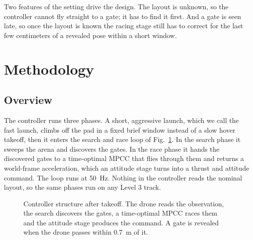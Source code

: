 \documentclass[conference]{IEEEtran}
\begin{document}
Two features of the setting drive the design. The layout is unknown, so the controller cannot fly straight to a gate; it has to find it first. And a gate is seen late, so once the layout is known the racing stage still has to correct for the last few centimeters of a revealed pose within a short window.

\section{Methodology}
\label{sec:method}

\subsection{Overview}
The controller runs three phases. A short, aggressive launch, which we call the fast launch, climbs off the pad in a fixed brief window instead of a slow hover takeoff, then it enters the search and race loop of Fig.~\ref{fig:pipeline}. In the search phase it sweeps the arena and discovers the gates. In the race phase it hands the discovered gates to a time-optimal MPCC that flies through them and returns a world-frame acceleration, which an attitude stage turns into a thrust and attitude command. The loop runs at 50~Hz. Nothing in the controller reads the nominal layout, so the same phases run on any Level 3 track.

\begin{figure}[t]
\centering
{}
\caption{Controller structure after takeoff. The drone reads the observation, the search discovers the gates, a time-optimal MPCC races them and the attitude stage produces the command. A gate is revealed when the drone passes within 0.7~m of it.}
\label{fig:pipeline}
\end{figure}
\end{document}
